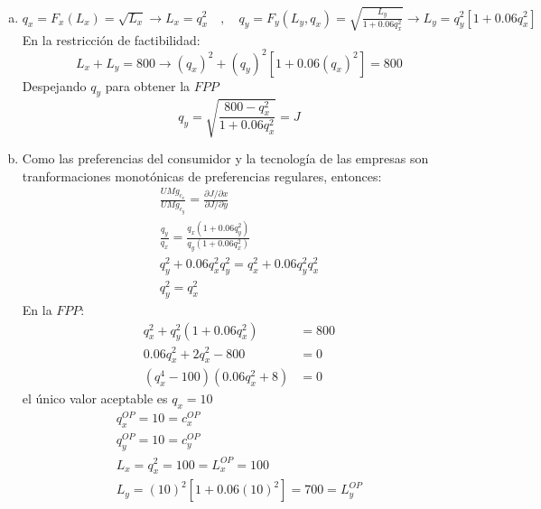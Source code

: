 \begin{enumerate}[a)]
	\item $q_x = F_x\left( L_x\right) = \sqrt{L_x} \rightarrow L_x = q_{x}^{2} \quad , \quad q_y = F_y\left( L_y, q_x\right) = \sqrt{\frac{L_y}{1+0.06q_{x}^{2}}} \rightarrow L_y = q_{y}^{2}\left[  1 + 0.06q_{x}^{2}\right]$\\
	
			En la restricción de factibilidad:
				$$L_x + L_y = 800 \rightarrow \left( q_x\right)^2 + \left( q_y\right)^2\left[  1 + 0.06\left( q_x\right) ^2\right] = 800$$
			Despejando $q_y$ para obtener la $FPP$
				$$q_y = \sqrt{\frac{800 - q_{x}^{2}}{1 + 0.06q_{x}^{2}}} = J$$
	\item Como las preferencias del consumidor y la tecnología de las empresas son tranformaciones monotónicas de preferencias regulares, entonces:
				\begin{gather*}
					\frac{UMg_{c_x}}{UMg_{c_y}} = \frac{\partial J/\partial x}{\partial J/\partial y}\\[0.3cm]
					\frac{q_y}{q_x} = \frac{q_x\left( 1+0.06q_{y}^{2}\right) }{q_y\left( 1+0.06q_{x}^{2}\right) }\\[0.3cm]
					q_{y}^{2} + 0.06q_{x}^{2}q_{y}^{2} = q_{x}^{2}+0.06q_{y}^{2}q_{x}^{2}\\[0.3cm]
					q_{y}^{2} = q_{x}^{2}
				\end{gather*}
			En la $FPP$:
				\begin{align*}
					q_{x}^{2}+ q_{y}^{2}\left( 1+0.06q_{x}^{2}\right) & = 800\\[0.3cm]
					0.06q_{x}^{2} + 2q_{x}^{2} - 800 & = 0\\[0.3cm]
					\left( q_{x}^{4} - 100\right) \left( 0.06q_{x}^{2}+8\right) & =0
				\end{align*}
			el único valor aceptable es $q_{x} = 10$
				\begin{gather*}
					q_{x}^{OP} = 10 = c_{x}^{OP}\\[0.3cm]
					q_{y}^{OP} = 10 = c_{y}^{OP}\\[0.3cm]
					L_x = q_{x}^{2} = 100 = L_x^{OP} = 100\\[0.3cm]
					L_y = (10)^2[1 + 0.06(10)^2] = 700 = L_{y}^{OP}
				\end{gather*}
\end{enumerate}